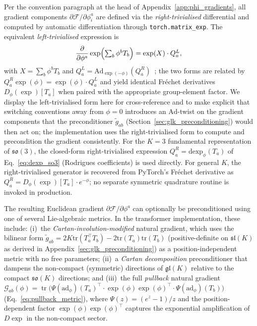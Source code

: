 \documentclass[twoside,11pt]{article}
\begin{document}
Per the convention paragraph at the head of Appendix~\ref{app:phi_gradients}, all gradient components $\partial \mathcal{F}/\partial \phi_i^a$ are defined via the \emph{right-trivialised} differential and computed by automatic differentiation through \texttt{torch.matrix\_exp}. The equivalent \emph{left-trivialised} expression is
\begin{equation}
\frac{\partial}{\partial \phi^a}\exp \Bigl(\textstyle\sum_b \phi^b T_b\Bigr) = \exp(X)\cdot Q_a^{L},
\end{equation}
with $X = \sum_b \phi^b T_b$ and $Q_a^{L} = \mathrm{Ad}_{\exp(-\phi)}(Q_a^{R})$~\citep{Hall2015}; the two forms are related by $Q_a^{R} \exp(\phi) = \exp(\phi) \cdot Q_a^{L}$ and yield identical Fr\'echet derivatives $D_\phi(\exp)[T_a]$ when paired with the appropriate group-element factor. We display the left-trivialised form here for cross-reference and to make explicit that switching conventions away from $\phi=0$ introduces an $\mathrm{Ad}$-twist on the gradient components that the preconditioner $\tilde g_{ab}$ (Section~\ref{sec:glk_preconditioning}) would then act on; the implementation uses the right-trivialised form to compute and precondition the gradient consistently. For the $K = 3$ fundamental representation of $\mathfrak{so}(3)$, the closed-form right-trivialised expression $Q_a^{R} = \mathrm{dexp}_\phi(T_a)$ of Eq.~\eqref{eq:dexp_so3} (Rodrigues coefficients) is used directly. For general $K$, the right-trivialised generator is recovered from PyTorch's Fr\'echet derivative as $Q_a^{R} = D_\phi(\exp)[T_a]\cdot e^{-\phi}$; no separate symmetric quadrature routine is invoked in production.

The resulting Euclidean gradient $\partial\mathcal{F}/\partial\phi^a$ can optionally be preconditioned using one of several Lie-algebraic metrics. In the transformer implementation, these include: (i)~the \emph{Cartan-involution-modified} natural gradient, which uses the bilinear form $\tilde{g}_{ab} = 2K \mathrm{tr}(T_a^\top T_b) - 2 \mathrm{tr}(T_a)\mathrm{tr}(T_b)$ (positive-definite on $\mathfrak{sl}(K)$ as derived in Appendix~\ref{sec:glk_preconditioning}) as a position-independent metric with no free parameters; (ii)~a \emph{Cartan decomposition} preconditioner that dampens the non-compact (symmetric) directions of $\mathfrak{gl}(K)$ relative to the compact $\mathfrak{so}(K)$ directions; and (iii)~the full \emph{pullback} natural gradient $\mathcal{G}_{ab}(\phi) = \operatorname{tr}\bigl(\Psi(\mathrm{ad}_\phi)(T_a)^\top \cdot \exp(\phi)\exp(\phi)^\top \cdot \Psi(\mathrm{ad}_\phi)(T_b)\bigr)$ (Eq.~\ref{eq:pullback_metric}), where $\Psi(z) = (e^z - 1)/z$ and the position-dependent factor $\exp(\phi)\exp(\phi)^\top$ captures the exponential amplification of $D\exp$ in the non-compact sector.
\end{document}

